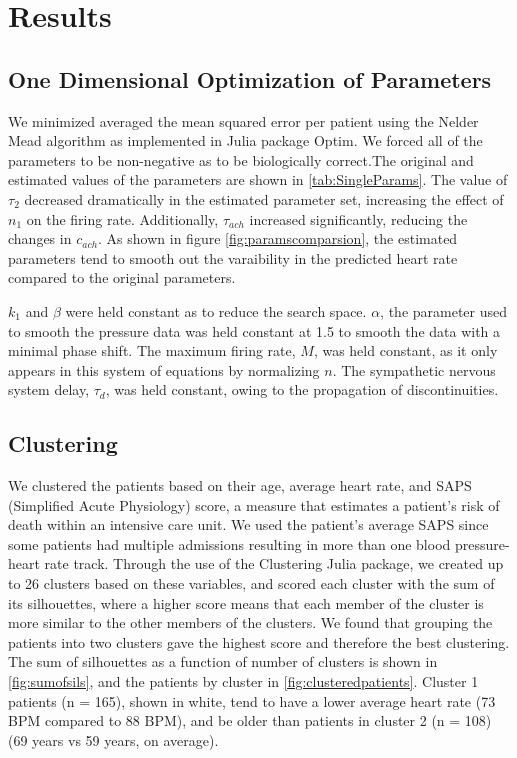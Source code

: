 \documentclass[fleqn,10pt]{wlscirep}
\begin{document}
\section*{Results}
\subsection*{One Dimensional Optimization of Parameters}
We minimized averaged the mean squared error per patient using the Nelder Mead algorithm as implemented in Julia package Optim. We forced all of the parameters to be non-negative as to be biologically correct.The original and estimated values of the parameters are shown in \ref{tab:SingleParams}. The value of $\tau_2$ decreased dramatically in the estimated parameter set, increasing the effect of $n_1$ on the firing rate. Additionally, $\tau_{ach}$ increased significantly, reducing the changes in $c_{ach}$. As shown in figure \ref{fig:paramscomparsion}, the estimated parameters tend to smooth out the varaibility in the predicted heart rate compared to the original parameters. 

$k_1$ and $\beta$ were held constant as to reduce the search space. $\alpha$, the parameter used to smooth the pressure data was held constant at 1.5 to smooth the data with a minimal phase shift. The maximum firing rate, $M$, was held constant, as it only appears in this system of equations by normalizing $n$. The sympathetic nervous system delay, $\tau_d$, was held constant, owing to the propagation of discontinuities. \cite{baker1997pitfalls}


\subsection*{Clustering}
We clustered the patients based on their age, average heart rate, and SAPS (Simplified Acute Physiology) score, a measure that estimates a patient's risk of death within an intensive care unit.\cite{le1993new} We used the patient's average SAPS since some patients had multiple admissions resulting in more than one blood pressure-heart rate track. 
Through the use of the Clustering Julia package, we created up to 26 clusters based on these variables, and scored each cluster with the sum of its silhouettes, where a higher score means that each member of the cluster is more similar to the other members of the clusters.\cite{rousseeuw1987silhouettes} We found that grouping the patients into two clusters gave the highest score and therefore the best clustering. The sum of silhouettes as a function of number of clusters is shown in \ref{fig:sumofsils}, and the patients by cluster in \ref{fig:clusteredpatients}. Cluster 1 patients (n = 165), shown in white, tend to have a lower average heart rate (73 BPM compared to 88 BPM), and be older than patients in cluster 2 (n = 108) (69 years vs 59 years, on average). 
\end{document}
